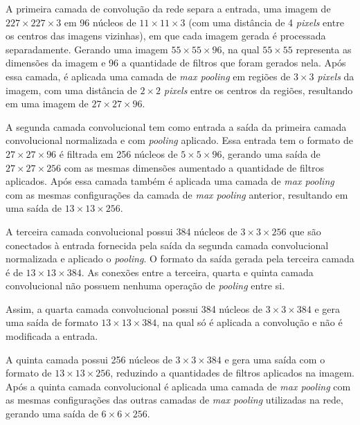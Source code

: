 \par A primeira camada de convolução da rede separa a entrada, uma imagem de $227\times227\times3$ em 96 núcleos de $11\times11\times3$ (com uma distância de 4 \textit{pixels} entre os centros das imagens vizinhas), em que cada imagem gerada é processada separadamente. 
Gerando uma imagem $55\times55\times96$, na qual $55\times55$ representa as dimensões da imagem e 96 a quantidade de filtros que foram gerados nela. Após essa camada, é aplicada uma camada de \textit{max pooling} em regiões de $3\times3$ \textit{pixels} da imagem, com uma distância de $2\times2$ \textit{pixels} entre os centros da regiões, resultando em uma imagem de $27\times27\times96$.

\par A segunda camada convolucional tem como entrada a saída da primeira camada convolucional normalizada e com \textit{pooling} aplicado. Essa entrada tem o formato de $27\times27\times96$ é filtrada em 256 núcleos de $5\times5\times96$, gerando uma saída de $27\times27\times256$ com as mesmas dimensões aumentado a quantidade de filtros aplicados. Após essa camada também é aplicada uma camada de \textit{max pooling} com as mesmas configurações da camada de \textit{max pooling} anterior, resultando em uma saída de $13\times13\times256$.

\par A terceira camada convolucional possui 384 núcleos de $3\times3\times256$ que são conectados à entrada fornecida pela saída da segunda camada convolucional normalizada e aplicado o \textit{pooling}. O formato da saída gerada pela terceira camada é de $13\times13\times384$. As conexões entre a terceira, quarta e quinta camada convolucional não possuem nenhuma operação de \textit{pooling} entre si. 

\par Assim, a quarta camada convolucional possui 384 núcleos de $3\times3\times384$ e gera uma saída de formato $13\times13\times384$, na qual só é aplicada a convolução e não é modificada a entrada.

\par A quinta camada possui 256 núcleos de $3\times3\times384$ e gera uma saída com o formato de $13\times13\times256$, reduzindo a quantidades de filtros aplicados na imagem. Após a quinta camada convolucional é aplicada uma camada de \textit{max pooling} com as mesmas configurações das outras camadas de \textit{max pooling} utilizadas na rede, gerando uma saída de $6\times6\times256$.

